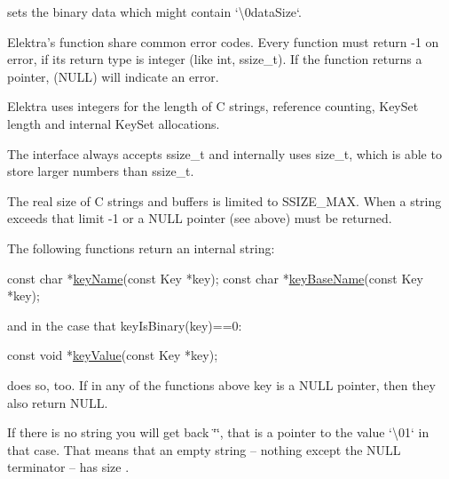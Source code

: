 sets the binary data which might contain `\textquotesingle{}\textbackslash{}0data\+Size`.

Elektra’s function share common error codes. Every function must return {\ttfamily -\/1} on error, if its return type is integer (like {\ttfamily int}, {\ttfamily ssize\+\_\+t}). If the function returns a pointer, {} ({\ttfamily N\+U\+LL}) will indicate an error.

Elektra uses integers for the length of C strings, reference counting, {\ttfamily Key\+Set} length and internal {\ttfamily Key\+Set} allocations.

The interface always accepts {\ttfamily ssize\+\_\+t} and internally uses {\ttfamily size\+\_\+t}, which is able to store larger numbers than {\ttfamily ssize\+\_\+t}.

The real size of C strings and buffers is limited to {\ttfamily S\+S\+I\+Z\+E\+\_\+\+M\+AX}. When a string exceeds that limit {\ttfamily -\/1} or a {\ttfamily N\+U\+LL} pointer (see above) must be returned.

The following functions return an internal string\+:


\begin{DoxyCode}
\textcolor{keyword}{const} \textcolor{keywordtype}{char} *\hyperlink{group__keyname_ga8e805c726a60da921d3736cda7813513}{keyName}(\textcolor{keyword}{const} Key *key);
\textcolor{keyword}{const} \textcolor{keywordtype}{char} *\hyperlink{group__keyname_gaaff35e7ca8af5560c47e662ceb9465f5}{keyBaseName}(\textcolor{keyword}{const} Key *key);
\end{DoxyCode}


and in the case that {\ttfamily key\+Is\+Binary(key)==0}\+:


\begin{DoxyCode}
\textcolor{keyword}{const} \textcolor{keywordtype}{void} *\hyperlink{group__keyvalue_ga6f29609c5da53c6dc26a98678d5752af}{keyValue}(\textcolor{keyword}{const} Key *key);
\end{DoxyCode}


does so, too. If in any of the functions above {\ttfamily key} is a {\ttfamily N\+U\+LL} pointer, then they also return {\ttfamily N\+U\+LL}.

If there is no string you will get back {\ttfamily \char`\"{}\char`\"{}}, that is a pointer to the value `\textquotesingle{}\textbackslash{}01` in that case. That means that an empty string – nothing except the N\+U\+LL terminator – has size {}.

